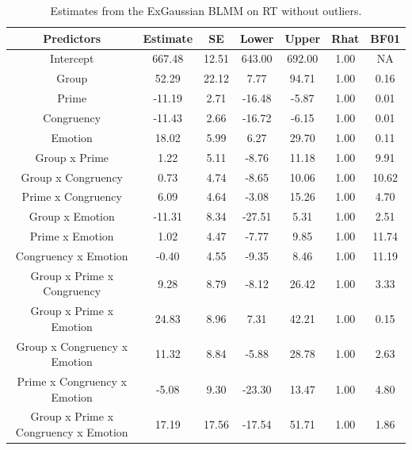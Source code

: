 \documentclass[
  11pt,
  english,
  ,doc,floatsintext]{apa6}
\begin{document}
\begin{table}[htb]

\begin{center}
\begin{threeparttable}

\caption{\label{tab:summaryBMwo}Estimates from the ExGaussian BLMM on RT without outliers.}

\small{

\begin{tabular}{ccccccc}
\toprule
Predictors & \multicolumn{1}{c}{Estimate} & \multicolumn{1}{c}{SE} & \multicolumn{1}{c}{Lower} & \multicolumn{1}{c}{Upper} & \multicolumn{1}{c}{Rhat} & \multicolumn{1}{c}{BF01}\\
\midrule
Intercept & 667.48 & 12.51 & 643.00 & 692.00 & 1.00 & NA\\
Group & 52.29 & 22.12 & 7.77 & 94.71 & 1.00 & 0.16\\
Prime & -11.19 & 2.71 & -16.48 & -5.87 & 1.00 & 0.01\\
Congruency & -11.43 & 2.66 & -16.72 & -6.15 & 1.00 & 0.01\\
Emotion & 18.02 & 5.99 & 6.27 & 29.70 & 1.00 & 0.11\\
Group x Prime & 1.22 & 5.11 & -8.76 & 11.18 & 1.00 & 9.91\\
Group x Congruency & 0.73 & 4.74 & -8.65 & 10.06 & 1.00 & 10.62\\
Prime x Congruency & 6.09 & 4.64 & -3.08 & 15.26 & 1.00 & 4.70\\
Group x Emotion & -11.31 & 8.34 & -27.51 & 5.31 & 1.00 & 2.51\\
Prime x Emotion & 1.02 & 4.47 & -7.77 & 9.85 & 1.00 & 11.74\\
Congruency x Emotion & -0.40 & 4.55 & -9.35 & 8.46 & 1.00 & 11.19\\
Group x Prime x Congruency & 9.28 & 8.79 & -8.12 & 26.42 & 1.00 & 3.33\\
Group x Prime x Emotion & 24.83 & 8.96 & 7.31 & 42.21 & 1.00 & 0.15\\
Group x Congruency x Emotion & 11.32 & 8.84 & -5.88 & 28.78 & 1.00 & 2.63\\
Prime x Congruency x Emotion & -5.08 & 9.30 & -23.30 & 13.47 & 1.00 & 4.80\\
Group x Prime x Congruency x Emotion & 17.19 & 17.56 & -17.54 & 51.71 & 1.00 & 1.86\\
\bottomrule
\end{tabular}

}

\end{threeparttable}
\end{center}

\end{table}
\end{document}
